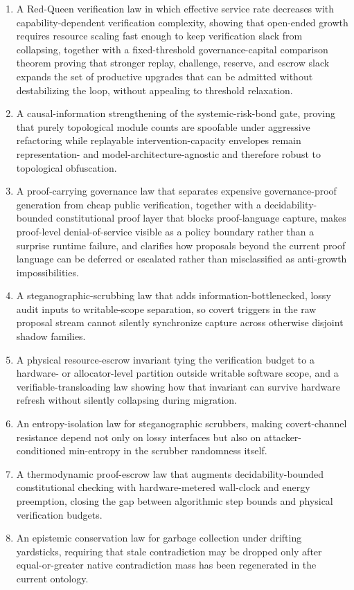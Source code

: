 \documentclass[11pt]{article}
\theoremstyle{definition}
\newcommand{\1}{\mathbf{1}}
\begin{document}
\begin{enumerate}[leftmargin=1.8em]
  \item A Red-Queen verification law in which effective service rate decreases with capability-dependent verification complexity, showing that open-ended growth requires resource scaling fast enough to keep verification slack from collapsing, together with a fixed-threshold governance-capital comparison theorem proving that stronger replay, challenge, reserve, and escrow slack expands the set of productive upgrades that can be admitted without destabilizing the loop, without appealing to threshold relaxation.
  \item A causal-information strengthening of the systemic-risk-bond gate, proving that purely topological module counts are spoofable under aggressive refactoring while replayable intervention-capacity envelopes remain representation- and model-architecture-agnostic and therefore robust to topological obfuscation.
  \item A proof-carrying governance law that separates expensive governance-proof generation from cheap public verification, together with a decidability-bounded constitutional proof layer that blocks proof-language capture, makes proof-level denial-of-service visible as a policy boundary rather than a surprise runtime failure, and clarifies how proposals beyond the current proof language can be deferred or escalated rather than misclassified as anti-growth impossibilities.
  \item A steganographic-scrubbing law that adds information-bottlenecked, lossy audit inputs to writable-scope separation, so covert triggers in the raw proposal stream cannot silently synchronize capture across otherwise disjoint shadow families.
  \item A physical resource-escrow invariant tying the verification budget to a hardware- or allocator-level partition outside writable software scope, and a verifiable-transloading law showing how that invariant can survive hardware refresh without silently collapsing during migration.
  \item An entropy-isolation law for steganographic scrubbers, making covert-channel resistance depend not only on lossy interfaces but also on attacker-conditioned min-entropy in the scrubber randomness itself.
  \item A thermodynamic proof-escrow law that augments decidability-bounded constitutional checking with hardware-metered wall-clock and energy preemption, closing the gap between algorithmic step bounds and physical verification budgets.
  \item An epistemic conservation law for garbage collection under drifting yardsticks, requiring that stale contradiction may be dropped only after equal-or-greater native contradiction mass has been regenerated in the current ontology.

\end{enumerate}
\end{document}
